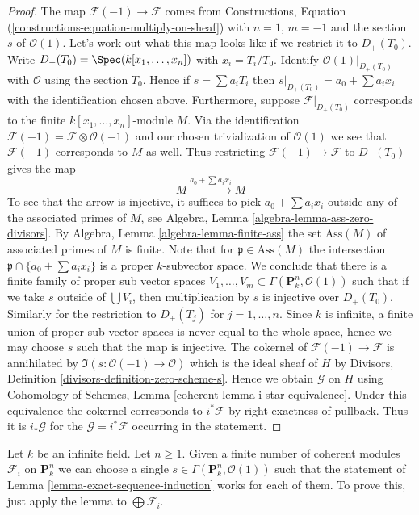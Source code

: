 \begin{proof}
The map $\mathcal{F}(-1) \to \mathcal{F}$ comes from
Constructions, Equation (\ref{constructions-equation-multiply-on-sheaf})
with $n = 1$, $m = -1$ and the section $s$ of $\mathcal{O}(1)$.
Let's work out what this map looks like if we restrict it to
$D_{+}(T_0)$. Write $D_{+}(T_0) = \Spec(k[x_1, \ldots, x_n])$
with $x_i = T_i/T_0$. Identify $\mathcal{O}(1)|_{D_{+}(T_0)}$ with
$\mathcal{O}$ using the section $T_0$. Hence if
$s = \sum a_iT_i$ then $s|_{D_{+}(T_0)} = a_0 + \sum a_ix_i$
with the identification chosen above. Furthermore, suppose
$\mathcal{F}|_{D_{+}(T_0)}$ corresponds to the finite
$k[x_1, \ldots, x_n]$-module $M$. Via the identification
$\mathcal{F}(-1) = \mathcal{F} \otimes \mathcal{O}(-1)$
and our chosen trivialization of $\mathcal{O}(1)$ we see that
$\mathcal{F}(-1)$ corresponds to $M$ as well. Thus
restricting $\mathcal{F}(-1) \to \mathcal{F}$ to $D_{+}(T_0)$ gives
the map
$$
M \xrightarrow{a_0 + \sum a_ix_i} M
$$
To see that the arrow is injective, it suffices to pick
$a_0 + \sum a_ix_i$ outside any of the associated primes of $M$, see
Algebra, Lemma \ref{algebra-lemma-ass-zero-divisors}. By
Algebra, Lemma \ref{algebra-lemma-finite-ass}
the set $\text{Ass}(M)$ of associated primes of $M$ is finite.
Note that for $\mathfrak p \in \text{Ass}(M)$ the intersection
$\mathfrak p \cap \{a_0 + \sum a_i x_i\}$ is a proper $k$-subvector space.
We conclude that there is a finite family of proper sub vector spaces
$V_1, \ldots, V_m \subset \Gamma(\mathbf{P}^n_k, \mathcal{O}(1))$
such that if we take $s$ outside of $\bigcup V_i$, then multiplication
by $s$ is injective over $D_{+}(T_0)$.
Similarly for the restriction to $D_{+}(T_j)$ for $j = 1, \ldots, n$.
Since $k$ is infinite, a finite union of proper sub vector spaces
is never equal to the whole space, hence we may choose $s$ such
that the map is injective.
The cokernel of $\mathcal{F}(-1) \to \mathcal{F}$ is annihilated
by $\Im(s : \mathcal{O}(-1) \to \mathcal{O})$ which is
the ideal sheaf of $H$ by
Divisors, Definition \ref{divisors-definition-zero-scheme-s}.
Hence we obtain $\mathcal{G}$ on $H$ using
Cohomology of Schemes, Lemma \ref{coherent-lemma-i-star-equivalence}.
Under this equivalence the cokernel corresponds to $i^*\mathcal{F}$ by
right exactness of pullback. Thus it is $i_*\mathcal{G}$ for the
$\mathcal{G} = i^*\mathcal{F}$ occurring in the statement.
\end{proof}

\begin{remark}
\label{remark-exact-sequence-induction}
Let $k$ be an infinite field. Let $n \geq 1$. Given a finite number
of coherent modules $\mathcal{F}_i$ on $\mathbf{P}^n_k$ we can choose
a single $s \in \Gamma(\mathbf{P}^n_k, \mathcal{O}(1))$ such
that the statement of Lemma \ref{lemma-exact-sequence-induction}
works for each of them.
To prove this, just apply the lemma to $\bigoplus \mathcal{F}_i$.
\end{remark}

